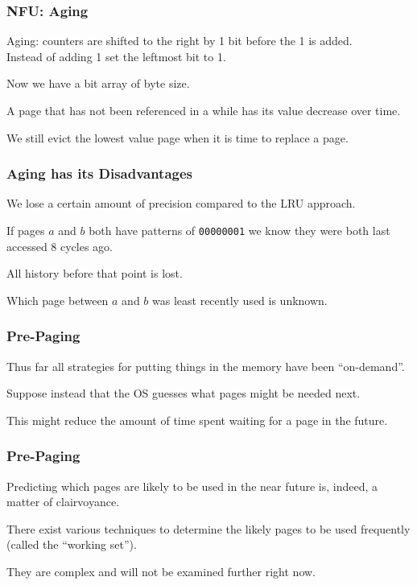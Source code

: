 \begin{frame}
\frametitle{NFU: Aging}

\alert{Aging}: counters are shifted to the right by 1 bit before the 1 is added.\\
\quad Instead of adding 1 set the leftmost bit to 1. 

Now we have a bit array of byte size.

A page that has not been referenced in a while has its value decrease over time. 

We still evict the lowest value page when it is time to replace a page.

\end{frame}

\begin{frame}
\frametitle{Aging has its Disadvantages}

We lose a certain amount of precision compared to the LRU approach.

If pages $a$ and $b$ both have patterns of \texttt{00000001} we know they were both last accessed 8 cycles ago. 

All history before that point is lost. 

Which page between $a$ and $b$ was least recently used is unknown.


\end{frame}

\begin{frame}
\frametitle{Pre-Paging}

Thus far all strategies for putting things in the memory have been ``on-demand''.
 
Suppose instead that the OS guesses what pages might be needed next.

This might reduce the amount of time spent waiting for a page in the future.

\end{frame}

\begin{frame}
\frametitle{Pre-Paging}

Predicting which pages are likely to be used in the near future is, indeed, a matter of clairvoyance. 

There exist various techniques to determine the likely pages to be used frequently (called the ``working set'').

They are complex and will not be examined further right now.

\end{frame}

